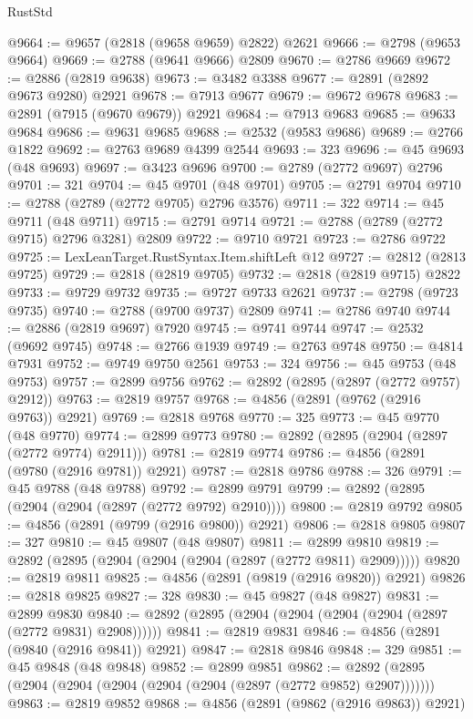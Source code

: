 \begin{lexlean}{RustStd}
\begin{coremodule}
@9664 := @9657 (@2818 (@9658 @9659) @2822) @2621
@9666 := @2798 (@9653 @9664)
@9669 := @2788 (@9641 @9666) @2809
@9670 := @2786 @9669
@9672 := @2886 (@2819 @9638)
@9673 := @3482 @3388
@9677 := @2891 (@2892 @9673 @9280) @2921
@9678 := @7913 @9677
@9679 := @9672 @9678
@9683 := @2891 (@7915 (@9670 @9679)) @2921
@9684 := @7913 @9683
@9685 := @9633 @9684
@9686 := @9631 @9685
@9688 := @2532 (@9583 @9686)
@9689 := @2766 @1822
@9692 := @2763 @9689 @4399 @2544
@9693 := 323
@9696 := @45 @9693 (@48 @9693)
@9697 := @3423 @9696
@9700 := @2789 (@2772 @9697) @2796
@9701 := 321
@9704 := @45 @9701 (@48 @9701)
@9705 := @2791 @9704
@9710 := @2788 (@2789 (@2772 @9705) @2796 @3576)
@9711 := 322
@9714 := @45 @9711 (@48 @9711)
@9715 := @2791 @9714
@9721 := @2788 (@2789 (@2772 @9715) @2796 @3281) @2809
@9722 := @9710 @9721
@9723 := @2786 @9722
@9725 := LexLeanTarget.RustSyntax.Item.shiftLeft @12
@9727 := @2812 (@2813 @9725)
@9729 := @2818 (@2819 @9705)
@9732 := @2818 (@2819 @9715) @2822
@9733 := @9729 @9732
@9735 := @9727 @9733 @2621
@9737 := @2798 (@9723 @9735)
@9740 := @2788 (@9700 @9737) @2809
@9741 := @2786 @9740
@9744 := @2886 (@2819 @9697) @7920
@9745 := @9741 @9744
@9747 := @2532 (@9692 @9745)
@9748 := @2766 @1939
@9749 := @2763 @9748
@9750 := @4814 @7931
@9752 := @9749 @9750 @2561
@9753 := 324
@9756 := @45 @9753 (@48 @9753)
@9757 := @2899 @9756
@9762 := @2892 (@2895 (@2897 (@2772 @9757) @2912))
@9763 := @2819 @9757
@9768 := @4856 (@2891 (@9762 (@2916 @9763)) @2921)
@9769 := @2818 @9768
@9770 := 325
@9773 := @45 @9770 (@48 @9770)
@9774 := @2899 @9773
@9780 := @2892 (@2895 (@2904 (@2897 (@2772 @9774) @2911)))
@9781 := @2819 @9774
@9786 := @4856 (@2891 (@9780 (@2916 @9781)) @2921)
@9787 := @2818 @9786
@9788 := 326
@9791 := @45 @9788 (@48 @9788)
@9792 := @2899 @9791
@9799 := @2892 (@2895 (@2904 (@2904 (@2897 (@2772 @9792) @2910))))
@9800 := @2819 @9792
@9805 := @4856 (@2891 (@9799 (@2916 @9800)) @2921)
@9806 := @2818 @9805
@9807 := 327
@9810 := @45 @9807 (@48 @9807)
@9811 := @2899 @9810
@9819 := @2892 (@2895 (@2904 (@2904 (@2904 (@2897 (@2772 @9811) @2909)))))
@9820 := @2819 @9811
@9825 := @4856 (@2891 (@9819 (@2916 @9820)) @2921)
@9826 := @2818 @9825
@9827 := 328
@9830 := @45 @9827 (@48 @9827)
@9831 := @2899 @9830
@9840 := @2892 (@2895 (@2904 (@2904 (@2904 (@2904 (@2897 (@2772 @9831) @2908))))))
@9841 := @2819 @9831
@9846 := @4856 (@2891 (@9840 (@2916 @9841)) @2921)
@9847 := @2818 @9846
@9848 := 329
@9851 := @45 @9848 (@48 @9848)
@9852 := @2899 @9851
@9862 := @2892 (@2895 (@2904 (@2904 (@2904 (@2904 (@2904 (@2897 (@2772 @9852) @2907)))))))
@9863 := @2819 @9852
@9868 := @4856 (@2891 (@9862 (@2916 @9863)) @2921)

\end{coremodule}
\end{lexlean}
